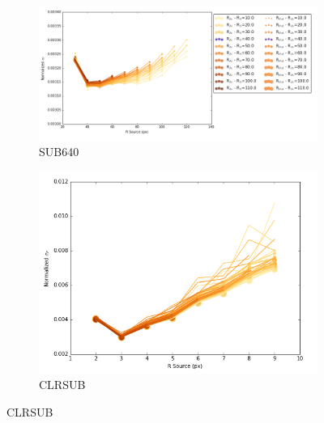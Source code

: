 \documentclass[conference]{IEEEtran}
\begin{document}
\begin{figure}[H]
    \centering
    \begin{subfigure}{1}
        \includegraphics[scale = 0.5]{Radius_640}
        \caption{SUB640}
    \end{subfigure}

    \begin{subfigure}{2}
        \includegraphics[scale=0.6]{Radius_CLR}
        \caption{CLRSUB}
    \end{subfigure}
\end{figure}
 
 
\end{document}
